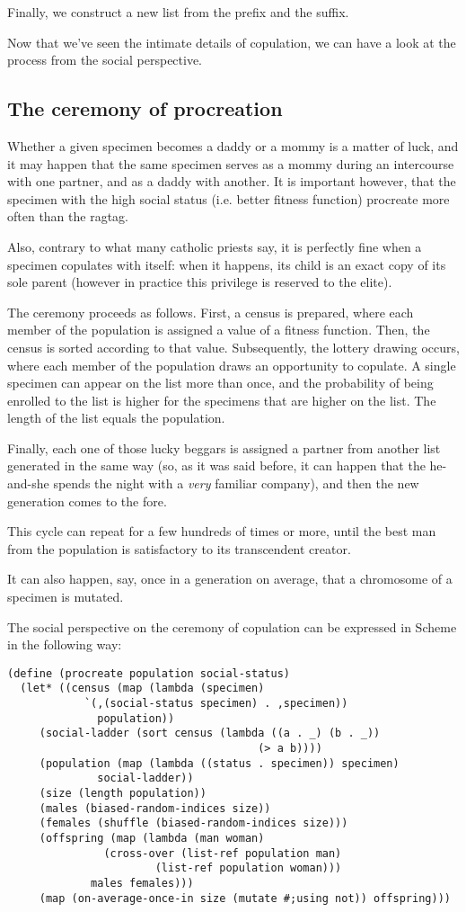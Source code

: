 Finally, we construct a new list from the prefix and the
suffix.

Now that we've seen the intimate details of copulation,
we can have a look at the process from the social perspective.

\subsection{The ceremony of procreation}

Whether a given specimen becomes a daddy or a mommy is
a matter of luck, and it may happen that the same specimen
serves as a mommy during an intercourse with one partner,
and as a daddy with another. It is important however, that the
specimen with the high social status (i.e. better fitness
function) procreate more often than the ragtag.

Also, contrary to what many catholic priests say, it is
perfectly fine when a specimen copulates with itself:
when it happens, its child is an exact copy of its sole
parent (however in practice this privilege is reserved
to the elite).

The ceremony proceeds as follows. First, a census is prepared,
where each member of the population is assigned a value
of a fitness function. Then, the census is sorted according
to that value. Subsequently, the lottery drawing occurs, where each
member of the population draws an opportunity to copulate.
A single specimen can appear on the list more than once, and
the probability of being enrolled to the list is higher for
the specimens that are higher on the list. The length of
the list equals the population. 

Finally, each one of those lucky beggars is assigned a partner
from another list generated in the same way (so, as it was said
before, it can happen that the he-and-she spends the night with
a \textit{very} familiar company), and then the new generation
comes to the fore.

This cycle can repeat for a few hundreds of times or more, until
the best man from the population is satisfactory to its
transcendent creator.

It can also happen, say, once in a generation on average,
that a chromosome of a specimen is mutated.

The social perspective on the ceremony of copulation can
be expressed in Scheme in the following way:

\begin{Verbatim}[samepage=true]
(define (procreate population social-status)
  (let* ((census (map (lambda (specimen)
			`(,(social-status specimen) . ,specimen))
		      population))
	 (social-ladder (sort census (lambda ((a . _) (b . _)) 
                                       (> a b))))
	 (population (map (lambda ((status . specimen)) specimen)
			  social-ladder))
	 (size (length population))
	 (males (biased-random-indices size))
	 (females (shuffle (biased-random-indices size)))
	 (offspring (map (lambda (man woman)
			   (cross-over (list-ref population man)
				       (list-ref population woman)))
			 males females)))
     (map (on-average-once-in size (mutate #;using not)) offspring)))
\end{Verbatim}

